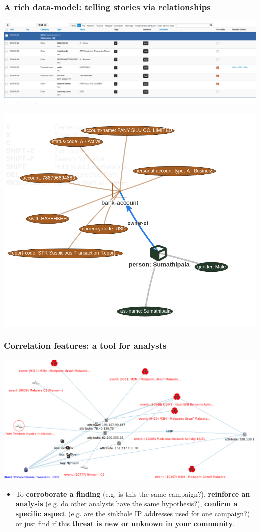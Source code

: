\begin{frame}
        \frametitle{A rich data-model: telling stories via relationships}
        \includegraphics[scale=0.25]{screenshots/bankaccount.png}
        \begin{center}
            \includegraphics[scale=0.18]{screenshots/bankview.png}
        \end{center}
\end{frame}

\begin{frame}
        \frametitle{Correlation features: a tool for analysts}
        \includegraphics[scale=0.18]{screenshots/campaign.png}
        \begin{itemize}
                \item To {\bf corroborate a finding} (e.g. is this the same campaign?), {\bf reinforce an analysis} (e.g. do other analysts have the same hypothesis?), {\bf confirm a specific aspect} (e.g. are the sinkhole IP addresses used for one campaign?) or just find if this {\bf threat is new or unknown in your community}.
        \end{itemize}
\end{frame}


